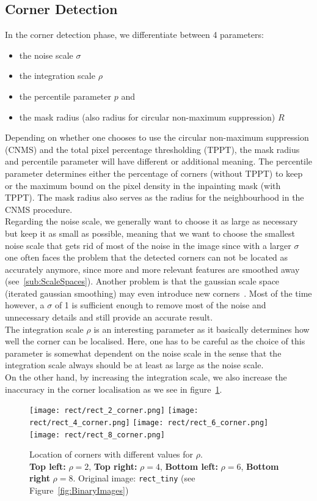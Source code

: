 \subsection{Corner Detection}\label{sec:CornerEx}
In the corner detection phase, we differentiate between 4 parameters:
\begin{itemize}
    \item the noise scale $\sigma$
    \item the integration scale $\rho$
    \item the percentile parameter $p$ and
    \item the mask radius (also radius for circular non-maximum suppression) $R$
\end{itemize}
Depending on whether one chooses to use the circular non-maximum suppression (CNMS) and the total pixel
percentage thresholding (TPPT), the mask radius and percentile parameter will have different or additional
meaning.
The percentile parameter determines either the percentage of corners (without TPPT) to keep or the maximum bound
on the pixel density in the inpainting mask (with TPPT).
The mask radius also serves as the radius for the neighbourhood in the CNMS procedure.\\
Regarding the noise scale, we generally want to choose it as large as necessary but keep it as small as
possible, meaning that we want to choose the smallest noise scale that gets rid of most of the
noise in the image since with a larger $\sigma$ 
one often faces the problem that the detected corners can not be located as accurately anymore,
since more and more relevant features are smoothed away (see~\ref{sub:ScaleSpaces}). Another problem
is that the gaussian scale space (iterated gaussian smoothing) may even introduce new
corners~\cite{weickert96}.
 Most of the time however, a $\sigma$ of 1 is sufficient enough to remove most of the noise and unnecessary
 details and still provide an accurate result.\\
 The integration scale $\rho$ is an interesting parameter as it basically determines how well the
 corner can be localised. Here, one has to be careful as the choice of this parameter is somewhat
 dependent on the noise scale in the sense that the integration scale always should be 
 at least as large as the noise scale.\\
 On the other hand, by increasing the integration scale, we also increase the inaccuracy in the corner 
 localisation as we see in figure~\ref{fig:Integration}.
\begin{figure}[h]
    \centering
    \texttt{[image: rect/rect\_2\_corner.png]}
    \texttt{[image: rect/rect\_4\_corner.png]}
    \texttt{[image: rect/rect\_6\_corner.png]}
    \texttt{[image: rect/rect\_8\_corner.png]}
    \caption{Location of corners with different values for $\rho$.\\
\textbf{Top left:} $\rho=2$, \textbf{Top right:} $\rho=4$, \textbf{Bottom left:}
$\rho=6$, \textbf{Bottom right} $\rho=8$. Original image: \texttt{rect\_tiny} (see Figure~\ref{fig:BinaryImages})}\label{fig:Integration}
\end{figure}
